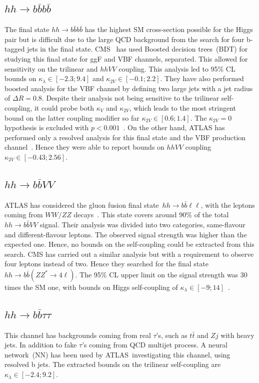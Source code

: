 \subsection*{$hh \to b\bar b b \bar b $}
The final state $ hh \to b\bar b b \bar b$ has the highest SM cross-section possible for the Higgs pair but is difficult due to the large QCD background from the search for four b-tagged jets in the final state. CMS~\cite{CMS-PAS-HIG-20-005} has used Boosted decision trees~(BDT) for studying this final state for ggF and VBF channels, separated. This allowed for sensitivity on the trilinear and $hhVV$ coupling. This analysis led to 95\% CL bounds on $\kappa_\lambda \in [-2.3;9.4]$ and $\kappa_{2V} \in [-0.1; 2.2]$.  They have also performed boosted analysis for the VBF channel by defining two large jets with a jet radius of $\Delta R =0.8$. Despite their analysis not being sensitive to the trilinear self-coupling, it could probe both $\kappa_V$ and  $\kappa_{2V} $, which leads to the most stringent bound on the latter coupling modifier so far  $\kappa_{2V}  \in [0.6;1.4]$. The $\kappa_{2V}=0$ hypothesis is excluded with $ p<0.001$~\cite{CMS-PAS-B2G-21-001}. On the other hand, ATLAS has performed only a resolved analysis for this final state and the VBF production channel~\cite{ATLAS:2020jgy}. Hence they were able to report bounds on $hhVV$ coupling $\kappa_{2V} \in [-0.43;2.56]$. 
\subsection*{$hh \to b\bar b VV $}
ATLAS has considered the gluon fusion final state~$hh \to b\bar b \ell \ell$, with the leptons coming from $WW/ZZ$ decays~\cite{ATLAS:2019vwv}. This state covers around $90\%$ of the total~$hh \to b\bar b VV $ signal. Their analysis was divided into two categories, same-flavour and different-flavour leptons. The observed signal strength was higher than the expected one. Hence, no bounds on the self-coupling could be extracted from this search. CMS has carried out a similar analysis but with a requirement to observe four leptons instead of two. Hence they searched for the final state $hh \to b\bar b( ZZ^*\to 4\ell)$. The 95\% CL upper limit on the signal strength was 30 times the SM one, with bounds on Higgs self-coupling of $\kappa_\lambda \in [-9;14]$~\cite{CMS-PAS-HIG-20-004}. 
\subsection*{$hh \to b\bar b \tau \tau $}
This channel has backgrounds coming from real $\tau$'s, such as $t\bar t$ and $Z j$ with heavy jets. In addition to fake $\tau$'s coming from QCD multijet process. A neural network~(NN) has been used by ATLAS~\cite{ATLAS-CONF-2021-052}investigating this channel, using resolved b jets. The extracted bounds on the trilinear self-coupling are $\kappa_\lambda \in [-2.4;9.2]$. 
